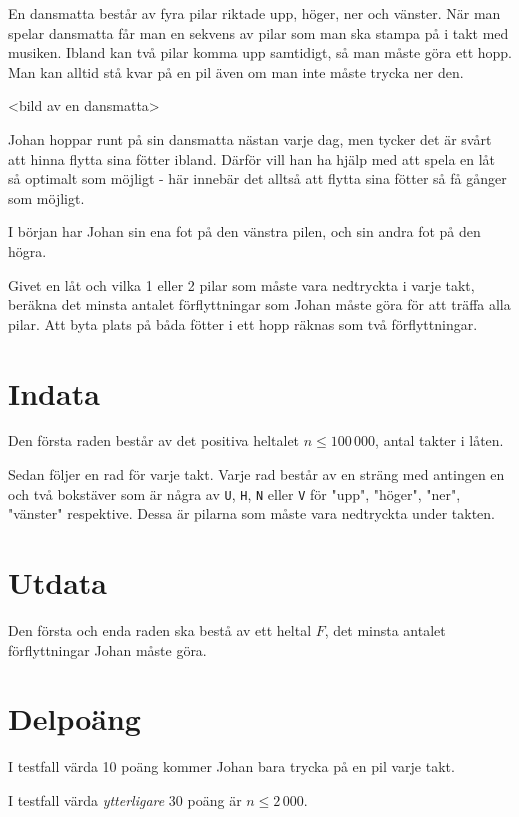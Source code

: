 En dansmatta består av fyra pilar riktade upp, höger, ner och vänster. När man spelar dansmatta får man en sekvens av pilar som man ska stampa på i takt med musiken. Ibland kan två pilar komma upp samtidigt, så man måste göra ett hopp. Man kan alltid stå kvar på en pil även om man inte måste trycka ner den. 

<bild av en dansmatta>

Johan hoppar runt på sin dansmatta nästan varje dag, men tycker det är svårt att hinna flytta sina fötter ibland. Därför vill han ha hjälp med att spela en låt så optimalt som möjligt - här innebär det alltså att flytta sina fötter så få gånger som möjligt.

I början har Johan sin ena fot på den vänstra pilen, och sin andra fot på den högra.

Givet en låt och vilka 1 eller 2 pilar som måste vara nedtryckta i varje takt, beräkna det minsta antalet förflyttningar som Johan måste göra för att träffa alla pilar. Att byta plats på båda fötter i ett hopp räknas som två förflyttningar. 


\section*{Indata}
Den första raden består av det positiva heltalet $n \le 100\,000$, antal takter i låten.

Sedan följer en rad för varje takt. Varje rad består av en sträng med antingen en och två bokstäver som är några av \texttt{U}, \texttt{H}, \texttt{N} eller \texttt{V} för "upp", "höger", "ner", "vänster" respektive. Dessa är pilarna som måste vara nedtryckta under takten.

\section*{Utdata}
Den första och enda raden ska bestå av ett heltal $F$, det minsta antalet förflyttningar Johan måste göra.

\section*{Delpoäng}
I testfall värda 10 poäng kommer Johan bara trycka på en pil varje takt.

I testfall värda \emph{ytterligare} 30 poäng är $n \le 2\,000$.
